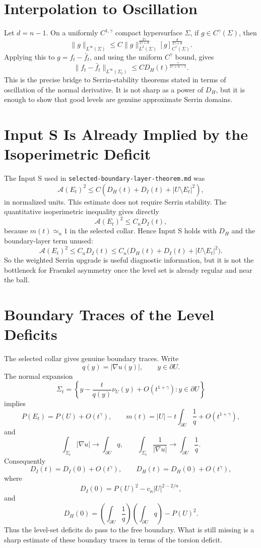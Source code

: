 \documentclass[11pt]{article}
\begin{document}
\section{Interpolation to Oscillation}

Let \(d=n-1\). On a uniformly \(C^{1,\gamma}\) compact hypersurface \(\Sigma\),
if \(g\in C^\gamma(\Sigma)\), then
\[
\|g\|_{L^\infty(\Sigma)}
\le
C
\|g\|_{L^2(\Sigma)}^{\frac{2\gamma}{2\gamma+d}}
[g]_{C^\gamma(\Sigma)}^{\frac{d}{2\gamma+d}}.
\]
Applying this to \(g=f_t-\bar f_t\), and using the uniform \(C^\gamma\) bound,
gives
\[
\|f_t-\bar f_t\|_{L^\infty(\Sigma_t)}
\le
C D_H(t)^{\frac{\gamma}{2\gamma+n-1}}.
\]
This is the precise bridge to Serrin-stability theorems stated in terms of
oscillation of the normal derivative. It is not sharp as a power of \(D_H\), but
it is enough to show that good levels are genuine approximate Serrin domains.

\section{Input S Is Already Implied by the Isoperimetric Deficit}

The Input S used in \texttt{selected-boundary-layer-theorem.md} was
\[
\mathcal A(E_t)^2
\le
C\left(D_H(t)+D_I(t)+|U\setminus E_t|^2\right),
\]
in normalized units. This estimate does not require Serrin stability. The
quantitative isoperimetric inequality gives directly
\[
\mathcal A(E_t)^2
\le C_n D_I(t),
\]
because \(m(t)\simeq_n1\) in the selected collar. Hence Input S holds with
\(D_H\) and the boundary-layer term unused:
\[
\boxed{
\mathcal A(E_t)^2\le C_n D_I(t)
\le C_n\bigl(D_H(t)+D_I(t)+|U\setminus E_t|^2\bigr).
}
\]
So the weighted Serrin upgrade is useful diagnostic information, but it is not
the bottleneck for Fraenkel asymmetry once the level set is already regular and
near the ball.

\section{Boundary Traces of the Level Deficits}

The selected collar gives genuine boundary traces. Write
\[
q(y)=|\nabla u(y)|,\qquad y\in\partial U.
\]
The normal expansion
\[
\Sigma_t=
\left\{
y-\frac{t}{q(y)}\nu_U(y)+O(t^{1+\gamma})
:y\in\partial U
\right\}
\]
implies
\[
P(E_t)=P(U)+O(t^\gamma),
\qquad
m(t)=|U|-t\int_{\partial U}\frac1q+O(t^{1+\gamma}),
\]
and
\[
\int_{\Sigma_t}|\nabla u|\to\int_{\partial U}q,
\qquad
\int_{\Sigma_t}\frac1{|\nabla u|}\to\int_{\partial U}\frac1q.
\]
Consequently
\[
D_I(t)=D_I(0)+O(t^\gamma),
\qquad
D_H(t)=D_H(0)+O(t^\gamma),
\]
where
\[
D_I(0)=P(U)^2-c_n|U|^{2-2/n},
\]
and
\[
D_H(0)=
\left(\int_{\partial U}\frac1q\right)
\left(\int_{\partial U}q\right)-P(U)^2.
\]
Thus the level-set deficits do pass to the free boundary. What is still missing
is a sharp estimate of these boundary traces in terms of the torsion deficit.
\end{document}
